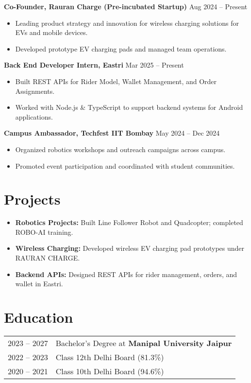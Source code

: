 \documentclass[a4paper,12pt]{article}
\begin{document}
\textbf{Co-Founder, Rauran Charge (Pre-incubated Startup)} \hfill Aug 2024 – Present  
\begin{itemize}[noitemsep, topsep=0pt]
    \item Leading product strategy and innovation for wireless charging solutions for EVs and mobile devices.
    \item Developed prototype EV charging pads and managed team operations.
\end{itemize}

\textbf{Back End Developer Intern, Eastri} \hfill Mar 2025 – Present  
\begin{itemize}[noitemsep, topsep=0pt]
    \item Built REST APIs for Rider Model, Wallet Management, and Order Assignments.
    \item Worked with Node.js \& TypeScript to support backend systems for Android applications.
\end{itemize}

\textbf{Campus Ambassador, Techfest IIT Bombay} \hfill May 2024 – Dec 2024  
\begin{itemize}[noitemsep, topsep=0pt]
    \item Organized robotics workshops and outreach campaigns across campus.
    \item Promoted event participation and coordinated with student communities.
\end{itemize}

  
\section*{Projects}
\begin{itemize}
    \item \textbf{Robotics Projects:} Built Line Follower Robot and Quadcopter; completed ROBO-AI training.
    \item \textbf{Wireless Charging:} Developed wireless EV charging pad prototypes under RAURAN CHARGE.
    \item \textbf{Backend APIs:} Designed REST APIs for rider management, orders, and wallet in Eastri.
\end{itemize}

\section{Education}
\begin{tabularx}{\linewidth}{@{}l X@{}}
2023 -- 2027 & Bachelor's Degree at \textbf{Manipal University Jaipur} \\
2022 -- 2023 & Class 12th Delhi Board \hfill (81.3\%) \\
2020 -- 2021 & Class 10th Delhi Board \hfill (94.6\%) \\
\end{tabularx}
\end{document}
